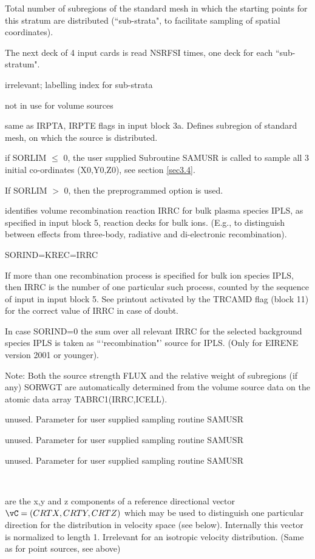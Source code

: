 \begin{list}{ }{}
\item[{\bf NSRFSI }]
Total number of subregions of the standard mesh in which the starting points
for this stratum are distributed (``sub-strata", to facilitate sampling of spatial coordinates).
\end{list}
The next deck of 4 input cards is read NSRFSI times, one deck for each ``sub-stratum".
\begin{list}{ }{}
\item[{\bf INUM }]
irrelevant; labelling index for sub-strata
\item[{\bf INDIM, INSOR }]
not in use for volume sources
\item[{\bf INGRDA, INGRDE }]
same as IRPTA, IRPTE flags in input block 3a. Defines subregion
of standard mesh, on which the source is distributed.
\item[{\bf SORLIM }]
if SORLIM $\le$ 0, the user supplied
Subroutine SAMUSR
is called to sample all 3 initial
co-ordinates (X0,Y0,Z0),
see section \ref{sec3.4}.

If SORLIM $>$  0, then the preprogrammed option is used.
\item[{\bf SORIND }]
identifies volume recombination reaction IRRC for bulk plasma species IPLS,
as specified in input block 5, reaction decks for bulk ions.
(E.g., to distinguish between effects from
three-body, radiative and di-electronic recombination).

SORIND=KREC=IRRC

If more than one recombination process is specified for bulk ion
species IPLS, then IRRC is the number of one particular such
process, counted by the sequence of input in input block 5. See
printout activated by the TRCAMD flag (block 11) for the correct
value of IRRC in case of doubt.

In case SORIND=0 the sum over all relevant IRRC for the selected
background species IPLS is taken as ```recombination"' source for
IPLS. (Only for EIRENE version 2001 or younger).

Note: Both the source strength FLUX and the relative weight of subregions
(if any)
SORWGT are automatically determined from the volume source data on the
atomic data array TABRC1(IRRC,ICELL).
\item[{\bf SORAD1 }]
unused. Parameter for user supplied sampling routine SAMUSR
\item[{\bf SORAD2 }]
unused. Parameter for user supplied sampling routine SAMUSR
\item[{\bf SORAD3 }]
unused. Parameter for user supplied sampling routine SAMUSR

\item[{\bf SORAD4, SORAD5, SORAD6 }] ~

are the x,y and z components of a reference directional
vector $\vC = (CRTX,CRTY,CRTZ)$
which may be used to distinguish one particular direction for the
distribution in velocity space (see below). Internally this vector
is normalized to length 1. Irrelevant for an isotropic velocity
distribution. (Same as for point sources, see above)
\
\end{list}

